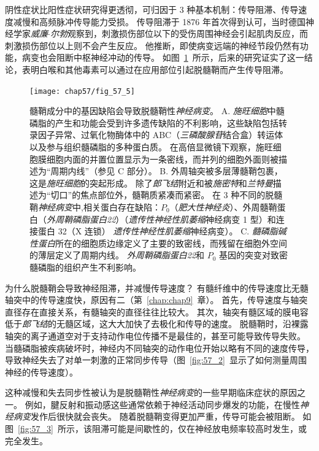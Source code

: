 阴性症状比阳性症状研究得更透彻，可归因于 3 种基本机制：传导阻滞、传导速度减慢和高频脉冲传导能力受损。
传导阻滞于 1876 年首次得到认可，当时德国神经学家\textit{威廉$\cdot$尔勃}观察到，刺激损伤部位以下的受伤周围神经会引起肌肉反应，而刺激损伤部位以上则不会产生反应。
他推断，即使病变远端的神经节段仍然有功能，病变也会阻断中枢神经冲动的传导。
如图~\ref{fig:57_5}~所示，后来的研究证实了这一结论，表明白喉和其他毒素可以通过在应用部位引起脱髓鞘而产生传导阻滞。


\begin{figure}[htbp]
	\centering
	\texttt{[image: chap57/fig\_57\_5]}
	\caption{髓鞘成分中的基因缺陷会导致脱髓鞘性\textit{神经病变}。
		A. \textit{施旺细胞}中髓磷脂的产生和功能会受到许多遗传缺陷的不利影响，这些缺陷包括转录因子异常、过氧化物酶体中的 ABC（\textit{三磷酸腺苷}结合盒）转运体以及参与组织髓磷脂的多种蛋白质。
		在高倍显微镜下观察，施旺细胞膜细胞内面的并置位置显示为一条密线，而并列的细胞外面则被描述为“周期内线”（参见 C 部分）\cite{lupski1998molecular}。 
		B. 外周轴突被多层薄髓鞘包裹，这是\textit{施旺细胞}的突起形成。
		除了\textit{郎飞结}附近和被\textit{施密特}和\textit{兰特曼}描述为“切口”的焦点部位外，髓鞘质紧凑而紧密。
		在 3 种不同的脱髓鞘\textit{神经病变}中,相关蛋白存在缺陷：$ P_0 $（\textit{肥大性神经炎}）、外周髓鞘蛋白（\textit{外周鞘磷脂蛋白22}）（\textit{遗传性神经性肌萎缩}神经病变 1 型）和连接蛋白 32（X 连锁） \textit{遗传性神经性肌萎缩}神经病变）\cite{lupski1998molecular}。
		C. \textit{髓磷脂碱性蛋白}所在的细胞质边缘定义了主要的致密线，而残留在细胞外空间的薄层定义了周期内线。
		\textit{外周鞘磷脂蛋白22}和 $P_0$ 基因的突变对致密髓磷脂的组织产生不利影响\cite{brown2002inherited}。}
	\label{fig:57_5}
\end{figure}


为什么脱髓鞘会导致神经阻滞，并减慢传导速度？
有髓纤维中的传导速度比无髓轴突中的传导速度快，原因有二（第~\ref{chap:chap9}~章）。
首先，传导速度与轴突直径存在直接关系，有髓轴突的直径往往比较大。
其次，轴突有髓区域的膜电容低于\textit{郎飞结}的无髓区域，这大大加快了去极化和传导的速度。
脱髓鞘时，沿裸露轴突的离子通道空对于支持动作电位传播不是最佳的，甚至可能导致传导失败。
当髓磷脂被疾病破坏时，神经内不同轴突的动作电位开始以略有不同的速度传导，导致神经失去了对单一刺激的正常同步传导（图~\ref{fig:57_2}~显示了如何测量周围神经的传导速度）。


这种减慢和失去同步性被认为是脱髓鞘性\textit{神经病变}的一些早期临床症状的原因之一。
例如，腱反射和振动感这些通常依赖于神经活动同步爆发的功能，在慢性\textit{神经病变}发作后很快就会丧失。
随着脱髓鞘变得更加严重，传导可能会被阻断。
如图~\ref{fig:57_3}~所示，该阻滞可能是间歇性的，仅在神经放电频率较高时发生，或完全发生。




